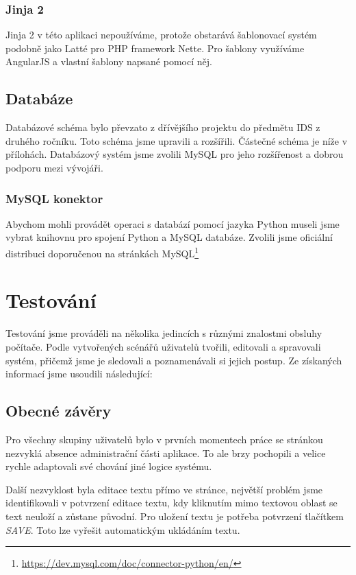 \documentclass[11pt,a4paper]{article}
\begin{document}
\subsubsection*{Jinja 2}
Jinja 2 v této aplikaci nepoužíváme, protože obstarává šablonovací systém podobně jako Latté pro PHP framework Nette. Pro šablony využíváme AngularJS a vlastní šablony napsané pomocí něj.

\subsection*{Databáze}
Databázové schéma bylo převzato z dřívějšího projektu do předmětu IDS z druhého ročníku. Toto schéma jsme upravili a rozšířili. Částečné schéma je níže v přílohách. Databázový systém jsme zvolili MySQL pro jeho rozšířenost a dobrou podporu mezi vývojáři.

\subsubsection*{MySQL konektor}
Abychom mohli provádět operaci s databází pomocí jazyka Python museli jsme vybrat knihovnu pro spojení Python a MySQL databáze. Zvolili jsme oficiální distribuci doporučenou na stránkách MySQL\footnote{\url{https://dev.mysql.com/doc/connector-python/en/}}



\section*{Testování}
Testování jsme prováděli na několika jedincích s různými znalostmi obsluhy počítače. Podle vytvořených scénářů uživatelů tvořili, editovali a spravovali systém, přičemž jsme je sledovali a poznamenávali si jejich postup. Ze získaných informací jsme usoudili následující:

\subsection*{Obecné závěry}
Pro všechny skupiny uživatelů bylo v prvních momentech práce se stránkou nezvyklá absence administrační části aplikace. To ale brzy pochopili a velice rychle adaptovali své chování jiné logice systému.

Další nezvyklost byla editace textu přímo ve stránce, největší problém jsme identifikovali v potvrzení editace textu, kdy kliknutím mimo textovou oblast se text neuloží a zůstane původní. Pro uložení textu je potřeba potvrzení tlačítkem {\em SAVE}. Toto lze vyřešit automatickým ukládáním textu.
\end{document}
